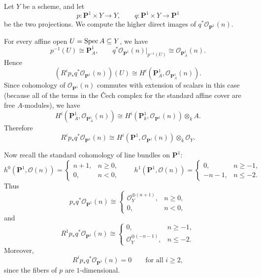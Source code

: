 \documentclass[12pt]{article}
\begin{document}
\begin{example}
    Let \(Y\) be a scheme, and let
    \[
        p:\mathbf P^1\times Y\to Y,
        \qquad
        q:\mathbf P^1\times Y\to \mathbf P^1
    \]
    be the two projections. We compute the higher direct images of \(q^*\mathcal O_{\mathbf P^1}(n)\).

    For every affine open \(U=\operatorname{Spec} A\subseteq Y\), we have
    \[
        p^{-1}(U)\cong \mathbf P^1_A,
        \qquad
        q^*\mathcal O_{\mathbf P^1}(n)\big|_{p^{-1}(U)}\cong \mathcal O_{\mathbf P^1_A}(n).
    \]
    Hence
    \[
        (R^ip_*q^*\mathcal O_{\mathbf P^1}(n))(U)
        \cong
        H^i(\mathbf P^1_A,\mathcal O_{\mathbf P^1_A}(n)).
    \]
    Since cohomology of \(\mathcal O_{\mathbf P^1}(n)\) commutes with extension of scalars in this case (because all of the terms in the \v{C}ech complex for the standard affine cover are free \(A\)-modules), we have
    \[
        H^i(\mathbf P^1_A,\mathcal O_{\mathbf P^1_A}(n))
        \cong
        H^i(\mathbf P^1_k,\mathcal O_{\mathbf P^1}(n))\otimes_k A.
    \]
    Therefore
    \[
        R^ip_*q^*\mathcal O_{\mathbf P^1}(n)
        \cong
        H^i(\mathbf P^1,\mathcal O_{\mathbf P^1}(n))\otimes_k \mathcal O_Y.
    \]

    Now recall the standard cohomology of line bundles on \(\mathbf P^1\):
    \[
        h^0(\mathbf P^1,\mathcal O(n))=
        \begin{cases}
            n+1, & n\ge 0, \\
            0,   & n<0,
        \end{cases}
        \qquad
        h^1(\mathbf P^1,\mathcal O(n))=
        \begin{cases}
            0,    & n\ge -1, \\
            -n-1, & n\le -2.
        \end{cases}
    \]
    Thus
    \[
        p_*q^*\mathcal O_{\mathbf P^1}(n)\cong
        \begin{cases}
            \mathcal O_Y^{\oplus (n+1)}, & n\ge 0, \\
            0,                           & n<0,
        \end{cases}
    \]
    and
    \[
        R^1p_*q^*\mathcal O_{\mathbf P^1}(n)\cong
        \begin{cases}
            0,                            & n\ge -1, \\
            \mathcal O_Y^{\oplus (-n-1)}, & n\le -2.
        \end{cases}
    \]
    Moreover,
    \[
        R^ip_*q^*\mathcal O_{\mathbf P^1}(n)=0
        \qquad\text{for all }i\ge 2,
    \]
    since the fibers of \(p\) are \(1\)-dimensional.
\end{example}
\end{document}
